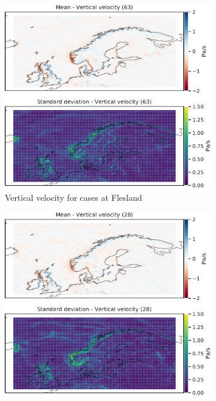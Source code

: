 \begin{figure}[H]
     \centering
     \begin{subfigure}[b]{0.49\textwidth}
         \centering
         \includegraphics[width=\textwidth]{Figures/WENBR.pdf}
         \caption{Vertical velocity for cases at Flesland}
         \label{fig:ENBRW}
     \end{subfigure}
     \hfill
     \begin{subfigure}[b]{0.49\textwidth}
         \centering
         \includegraphics[width=\textwidth]{Figures/WENZV.pdf}

\end{subfigure}
\end{figure}
